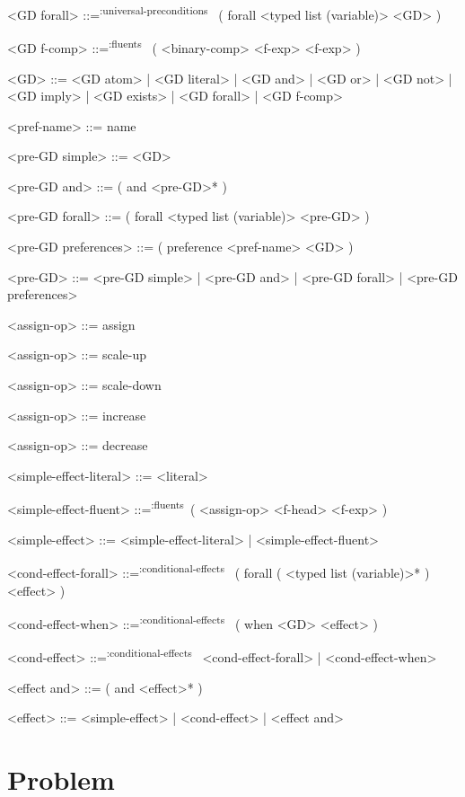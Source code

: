 \documentclass[]{article}
\newcommand{\fluents}{\textsuperscript{:fluents}~}
\newcommand{\universalpreconditions}{\textsuperscript{:universal-preconditions}~}
\newcommand{\conditionaleffects}{\textsuperscript{:conditional-effects}~}
\begin{document}
\begin{grammar}
    <GD forall> ::=\universalpreconditions{} ( forall <typed list (variable)> <GD> )

    <GD f-comp> ::=\fluents{} ( <binary-comp> <f-exp> <f-exp> )

    <GD> ::= <GD atom> | <GD literal> | <GD and> | <GD or> | <GD not> | <GD imply> | <GD exists> | <GD forall> | <GD f-comp>

    <pref-name> ::= name

    <pre-GD simple> ::= <GD>

    <pre-GD and> ::= ( and <pre-GD>* )

    <pre-GD forall> ::= ( forall <typed list (variable)> <pre-GD> )

    <pre-GD preferences> ::= ( preference <pref-name> <GD> )

    <pre-GD> ::= <pre-GD simple> | <pre-GD and> | <pre-GD forall> | <pre-GD preferences>


    <assign-op> ::= assign

    <assign-op> ::= scale-up

    <assign-op> ::= scale-down

    <assign-op> ::= increase

    <assign-op> ::= decrease

    <simple-effect-literal> ::= <literal>

    <simple-effect-fluent> ::=\fluents ( <assign-op> <f-head> <f-exp> )

    <simple-effect> ::= <simple-effect-literal> | <simple-effect-fluent>

    <cond-effect-forall> ::=\conditionaleffects{} ( forall ( <typed list (variable)>* ) <effect> )

    <cond-effect-when> ::=\conditionaleffects{} ( when <GD> <effect> )

    <cond-effect> ::=\conditionaleffects{} <cond-effect-forall> | <cond-effect-when>

    <effect and> ::= ( and <effect>* )

    <effect> ::= <simple-effect> | <cond-effect> | <effect and>
\end{grammar}

\section{Problem}
\end{document}
